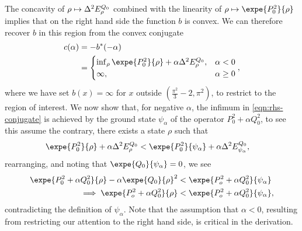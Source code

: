 The concavity of $\rho\mapsto\var{E^{Q_0}_\rho}$ combined with the linearity of $\rho\mapsto \expe{P_0^2}{\rho}$ implies that on the right hand side the function $b$ is convex. We can therefore recover $b$ in this region from the convex conjugate
\begin{align}
  c(\alpha) &= -b^*(-\alpha)\\
  \label{eqn:rhs-conjugate}
            &= \begin{cases}\inf_{\rho}\expe{P_0^2}{\rho} + \alpha\var{E^{Q_0}_\rho}, & \alpha < 0\\
              \infty, & \alpha \geq 0
            \end{cases},
\end{align}
where we have set $b(x) = \infty$ for $x$ outside $\left(\frac{\pi^2}{3} -2,\pi^2\right)$, to restrict to the region of interest. We now show that, for negative $\alpha$, the infimum in \eqref{eqn:rhs-conjugate} is achieved by the ground state $\psi_\alpha$ of the operator $P_0^2 + \alpha Q_0^2$, to see this assume the contrary, there exists a state $\rho$ such that 
\begin{align}
  \expe{P_0^2}{\rho} + \alpha\var{E^{Q_0}_\rho} &< \expe{P_0^2}{\psi_\alpha} + \alpha\var{E^{Q_0}_{\psi_\alpha}},
\end{align}
rearranging, and noting that $\expe{Q_0}{\psi_\alpha} = 0$, we see
\begin{align}
  \expe{P_0^2 + \alpha Q_0^2}{\rho} - \alpha\expe{Q_0}{\rho}^2 &< \expe{P_o^2 + \alpha Q_0^2}{\psi_\alpha}\\
  \implies \expe{P_o^2 + \alpha Q_0^2}{\rho} &< \expe{P_o^2 + \alpha Q_0^2}{\psi_\alpha},
\end{align}
contradicting the definition of $\psi_\alpha$. Note that the assumption that $\alpha < 0$, resulting from restricting our attention to the right hand side, is critical in the derivation. 

